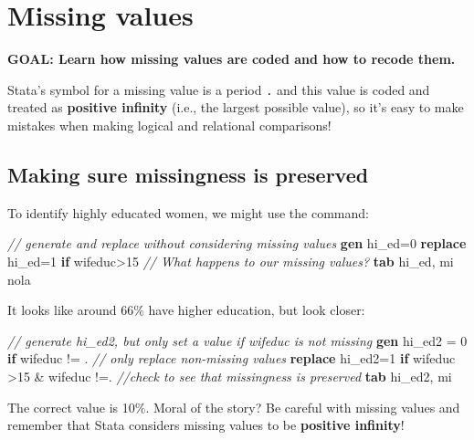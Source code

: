 \documentclass[
]{book}
\newenvironment{Shaded}{\begin{snugshade}}{\end{snugshade}}
\newcommand{\CommentTok}[1]{\textcolor[rgb]{0.56,0.35,0.01}{\textit{#1}}}
\newcommand{\FunctionTok}[1]{\textcolor[rgb]{0.00,0.00,0.00}{#1}}
\newcommand{\KeywordTok}[1]{\textcolor[rgb]{0.13,0.29,0.53}{\textbf{#1}}}
\newcommand{\NormalTok}[1]{#1}
\begin{document}
\hypertarget{missing-values}{%
\section{Missing values}\label{missing-values}}

\textbf{GOAL: Learn how missing values are coded and how to recode them.}

Stata's symbol for a missing value is a period \texttt{.} and this value is coded and treated as \textbf{positive infinity} (i.e., the largest possible value), so it's easy to make mistakes when making logical and relational comparisons!

\hypertarget{making-sure-missingness-is-preserved}{%
\subsection{Making sure missingness is preserved}\label{making-sure-missingness-is-preserved}}

To identify highly educated women, we might use the command:

\begin{Shaded}
\begin{Highlighting}[]
\CommentTok{// generate and replace without considering missing values}
\KeywordTok{gen}\NormalTok{ hi\_ed=0}
\KeywordTok{replace}\NormalTok{ hi\_ed=1 }\KeywordTok{if}\NormalTok{ wifeduc\textgreater{}15}
\CommentTok{// What happens to our missing values?}
\KeywordTok{tab}\NormalTok{ hi\_ed, }\FunctionTok{mi}\NormalTok{ nola}
\end{Highlighting}
\end{Shaded}

It looks like around 66\% have higher education, but look closer:

\begin{Shaded}
\begin{Highlighting}[]
\CommentTok{// generate hi\_ed2, but only set a value if wifeduc is not missing}
\KeywordTok{gen}\NormalTok{ hi\_ed2 = 0 }\KeywordTok{if}\NormalTok{ wifeduc != . }
\CommentTok{// only replace non{-}missing values}
\KeywordTok{replace}\NormalTok{ hi\_ed2=1 }\KeywordTok{if}\NormalTok{ wifeduc \textgreater{}15 \& wifeduc !=. }
\CommentTok{//check to see that missingness is preserved}
\KeywordTok{tab}\NormalTok{ hi\_ed2, }\FunctionTok{mi}
\end{Highlighting}
\end{Shaded}

The correct value is 10\%. Moral of the story? Be careful with missing values and remember that Stata considers missing values to be \textbf{positive infinity}!
\end{document}
